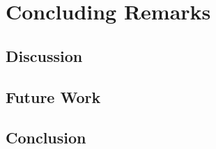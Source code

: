 \section{Concluding Remarks}
\subsection{Discussion}
\subsection{Future Work}
\subsection{Conclusion}
